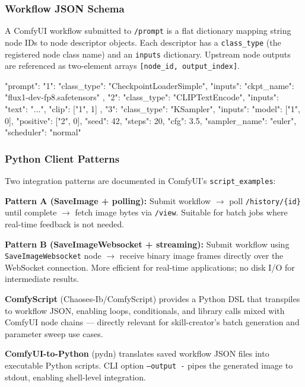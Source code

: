 \documentclass[11pt,letterpaper]{article}
\begin{document}
\subsubsection{Workflow JSON Schema}

A ComfyUI workflow submitted to \texttt{/prompt} is a flat dictionary mapping string
node IDs to node descriptor objects. Each descriptor has a \texttt{class\_type} (the
registered node class name) and an \texttt{inputs} dictionary. Upstream node outputs
are referenced as two-element arrays \texttt{[node\_id, output\_index]}.

\begin{asciibox}
{
  "prompt": {
    "1": {
      "class_type": "CheckpointLoaderSimple",
      "inputs": { "ckpt_name": "flux1-dev-fp8.safetensors" }
    },
    "2": {
      "class_type": "CLIPTextEncode",
      "inputs": { "text": "...", "clip": ["1", 1] }
    },
    "3": {
      "class_type": "KSampler",
      "inputs": {
        "model": ["1", 0],
        "positive": ["2", 0],
        "seed": 42, "steps": 20, "cfg": 3.5,
        "sampler_name": "euler", "scheduler": "normal"
      }
    }
  }
}
\end{asciibox}

\subsubsection{Python Client Patterns}

Two integration patterns are documented in ComfyUI's \texttt{script\_examples}:

\textbf{Pattern A (SaveImage + polling):} Submit workflow $\to$ poll
\texttt{/history/\{id\}} until complete $\to$ fetch image bytes via \texttt{/view}.
Suitable for batch jobs where real-time feedback is not needed.

\textbf{Pattern B (SaveImageWebsocket + streaming):} Submit workflow using
\texttt{SaveImageWebsocket} node $\to$ receive binary image frames directly over
the WebSocket connection. More efficient for real-time applications; no disk I/O
for intermediate results.

\textbf{ComfyScript} (Chaoses-Ib/ComfyScript) provides a Python DSL that transpiles
to workflow JSON, enabling loops, conditionals, and library calls mixed with ComfyUI
node chains --- directly relevant for skill-creator's batch generation and parameter
sweep use cases.

\textbf{ComfyUI-to-Python} (pydn) translates saved workflow JSON files into executable
Python scripts. CLI option \texttt{--output -} pipes the generated image to stdout,
enabling shell-level integration.
\end{document}

